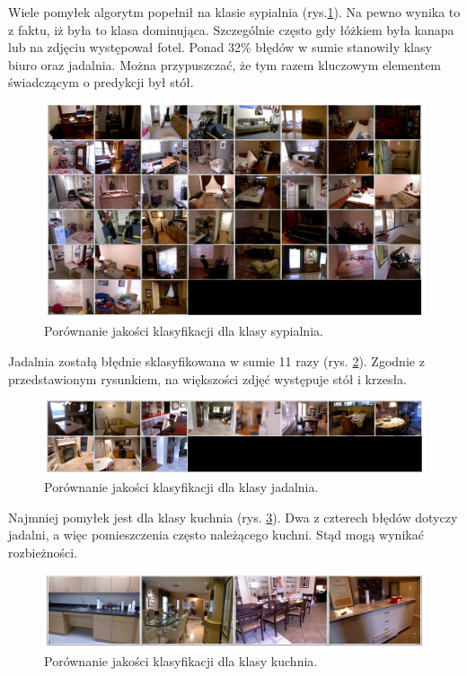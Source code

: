 Wiele pomyłek algorytm popełnił na klasie sypialnia (rys.\ref{fig:bedroom-false-pred}). Na pewno wynika to z faktu, iż była to klasa dominująca. Szczególnie często gdy łóżkiem była kanapa lub na zdjęciu występował fotel. Ponad 32\% błędów w sumie stanowiły klasy biuro oraz jadalnia. Można przypuszczać, że tym razem kluczowym elementem świadczącym o predykcji był stół.
\begin{figure}[ht!]
    \centering
    \includegraphics[width=\textwidth]{img/preds_analysis/classification/bedroom-2.png}
    \caption{Porównanie jakości klasyfikacji dla klasy sypialnia.}
    \label{fig:bedroom-false-pred}
\end{figure}

Jadalnia zostałą błędnie sklasyfikowana w sumie 11 razy (rys. \ref{fig:dining_room-false-pred}). Zgodnie z przedstawionym rysunkiem, na większości zdjęć występuje stół i krzesła.

\begin{figure}[ht!]
    \centering
    \includegraphics[width=\textwidth]{img/preds_analysis/classification/dining_room-2.png}
    \caption{Porównanie jakości klasyfikacji dla klasy jadalnia.}
    \label{fig:dining_room-false-pred}
\end{figure}

Najmniej pomyłek jest dla klasy kuchnia (rys. \ref{fig:kitchen-false-pred}). Dwa z czterech błędów dotyczy jadalni, a więc pomieszczenia często należącego kuchni. Stąd mogą wynikać rozbieżności.
\begin{figure}[ht!]
    \centering
    \includegraphics[width=\textwidth]{img/preds_analysis/classification/kitchen-2.png}
    \caption{Porównanie jakości klasyfikacji dla klasy kuchnia.}
    \label{fig:kitchen-false-pred}
\end{figure}

